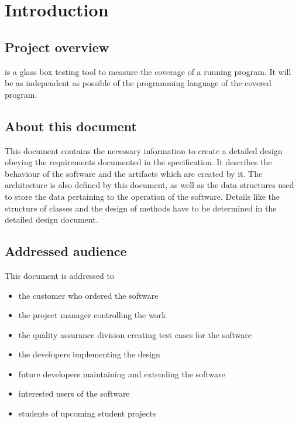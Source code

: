 \section{Introduction} \label{Introduction}

\subsection{Project overview} \label{in:Overview}
\gbt is a glass box testing tool to measure the coverage of a running program.
It will be as independent as possible of the programming language of the covered program.

\subsection{About this document} \label{in:AboutThisDocument}

This document contains the necessary information to create a detailed design
obeying the requirements documented in the specification. It describes the
behaviour of the software and the artifacts which are created by it. The
architecture is also defined by this document, as well as the data structures
used to store the data pertaining to the operation of the software. Details
like the structure of classes and the design of methods have to be determined
in the detailed design document.


\subsection{Addressed audience} \label{in:Addressed audience}
This document is addressed to
\begin{itemize}
  \item the customer who ordered the software
  \item the project manager controlling the work
  \item the quality assurance division creating test cases for the software
  \item the developers implementing the design
  \item future developers maintaining and extending the software
  \item interested users of the software
  \item students of upcoming student projects
\end{itemize}

